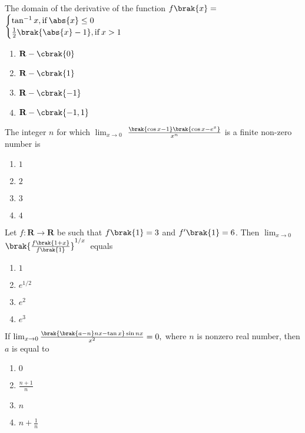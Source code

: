 \item %

    The domain of the derivative of the function
		$f\brak{x}=$
 $\begin{cases}
	\tan^{-1}x, \text{if} \: \abs{x}\leq0 \\
    	\frac{1}{2}\brak{\abs{x}-1}, \text{if} \: x > 1 
\end{cases} $ \  \hfill{}
    \begin{enumerate}
	    \item $\mathbf{R}-\cbrak{0}$
	    \item $\mathbf{R}-\cbrak{1}$
	    \item $\mathbf{R}-\cbrak{-1}$
	    \item $\mathbf{R}-\cbrak{-1,1}$\\
    \end{enumerate}


\item %

	The integer $n$ for which $\lim_{x \to 0}$ $\frac{\brak{\cos x-1} \brak{\cos x-e^{x}}}{x^{n}}$ is a finite non-zero number is \hfill{}
    \begin{enumerate}
     \item $1$
     \item $2$
     \item $3$
     \item $4$\\
    \end{enumerate}

\item %

	Let $f:\mathbf{R} \rightarrow \mathbf{R}$ be such that $f\brak{1}=3$ and $f^{\prime}\brak{1}=6$. Then $\lim_{x \to 0}$ $ \brak{ \frac{f\brak{1+x}}{f\brak{1}}}^{1/x}$\ equals \hfill{}
    \begin{enumerate}
     \item $1$
     \item $e^{1/2}$
     \item $e^2$
     \item $e^3$\\
    \end{enumerate}


\item %

	If $\lim_{x \to 0} \frac{\brak{\brak{a-n}nx-\tan x}\sin nx}{x^2} =0,$ where $n$ is nonzero real number, then $a$ is equal to\hfill{}
    \begin{enumerate}
     \item $0$
     \item $\frac{n+1}{n}$
     \item $n$
     \item $n+\frac{1}{n}$\\
    \end{enumerate}



